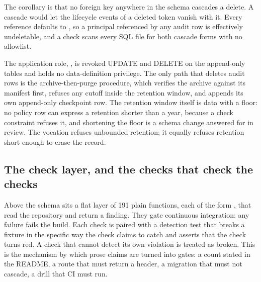 The corollary is that no foreign key anywhere in the schema cascades a delete. A cascade would let
the lifecycle events of a deleted token vanish with it. Every reference defaults to , so a principal referenced by any audit row is effectively undeletable, and a check scans
every SQL file for both cascade forms with no allowlist.

The application role, , is revoked UPDATE and DELETE on the append-only tables
and holds no data-definition privilege. The only path that deletes audit rows is the archive-then-purge
procedure, which verifies the archive against its manifest first, refuses any cutoff inside the
retention window, and appends its own append-only checkpoint row. The retention window itself is
data with a floor: no policy row can express a retention shorter than a year, because a check
constraint refuses it, and shortening the floor is a schema change answered for in review. The
vocation refuses unbounded retention; it equally refuses retention short enough to erase the record.
\sImpl

\subsection{The check layer, and the checks that check the checks}

Above the schema sits a flat layer of 191 plain functions, each of the form
, that read the repository and return a finding. They gate continuous
integration: any failure fails the build. Each check is paired with a detection test that breaks a
fixture in the specific way the check claims to catch and asserts that the check turns red. A check
that cannot detect its own violation is treated as broken. This is the mechanism by which prose
claims are turned into gates: a count stated in the README, a route that must return a header, a
migration that must not cascade, a drill that CI must run. \sImpl

